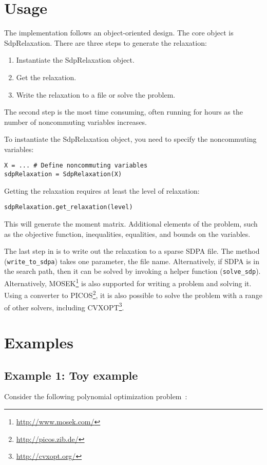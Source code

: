 \documentclass{article}
\begin{document}
\section{Usage}
The implementation follows an object-oriented design. The core object is SdpRelaxation. There are three steps to generate the relaxation:
\begin{enumerate}
  \item Instantiate the SdpRelaxation object.
  \item Get the relaxation.
  \item Write the relaxation to a file or solve the problem.
\end{enumerate}

The second step is the most time consuming, often running for hours as the number of noncommuting variables increases.

To instantiate the SdpRelaxation object, you need to specify the noncommuting variables:
\begin{verbatim}
X = ... # Define noncommuting variables
sdpRelaxation = SdpRelaxation(X)
\end{verbatim}

Getting the relaxation requires at least the level of relaxation:
\begin{verbatim}
sdpRelaxation.get_relaxation(level)
\end{verbatim}
This will generate the moment matrix. Additional elements of the problem, such as the objective function, inequalities, equalities, and bounds on the variables.

The last step in is to write out the relaxation to a sparse SDPA file. The method (\verb+write_to_sdpa+) takes one parameter, the file name. Alternatively, if SDPA is in the search path, then it can be solved by invoking a helper function (\verb+solve_sdp+). Alternatively, MOSEK\footnote{\url{http://www.mosek.com/}} is also supported for writing a problem and solving it. Using a converter to PICOS\footnote{\url{http://picos.zib.de/}}, it is also possible to solve the problem with a range of other solvers, including CVXOPT\footnote{\url{http://cvxopt.org/}}.

\section{Examples}
\subsection{Example 1: Toy example}\label{example1}
Consider the following polynomial optimization problem~\citep{pironio2010convergent}:
\end{document}
